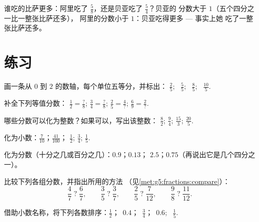 \begin{example}\label{ex:g5:fractions:compare}
谁吃的比萨更多：阿里吃了 $\frac58$，还是贝亚吃了 $\frac54$？贝亚的
分数大于 $1$（五个四分之一比一整张比萨还多），
阿里的分数小于 $1$：贝亚吃得更多 --- 事实上她
吃了一整张比萨还多。
\end{example}

\section{练习}

\begin{exercise}[$\star$]\label{exo:g5:fractions:1}
画一条从 $0$ 到 $2$ 的数轴，每个单位五等分，并标出：
$\frac25$; \ $\frac55$; \ $\frac85$; \ $\frac{10}{5}$.
\end{exercise}

\begin{exercise}[$\star$]\label{exo:g5:fractions:2}
补全下列等值分数：
$\frac12 = \frac{?}{8}$; \quad
$\frac34 = \frac{?}{8}$; \quad
$\frac{2}{5} = \frac{4}{?}$; \quad
$\frac{6}{9} = \frac{2}{?}$.
\end{exercise}

\begin{exercise}[$\star$]\label{exo:g5:fractions:3}
哪些分数可以化为整数？如果可以，写出该整数：
$\frac82$; \quad $\frac{9}{4}$; \quad $\frac{15}{3}$; \quad
$\frac{20}{5}$.
\end{exercise}

\begin{exercise}[$\star$]\label{exo:g5:fractions:4}
化为小数：$\frac{7}{10}$；\quad $\frac{41}{100}$；\quad
$\frac12$; \quad $\frac34$; \quad $\frac15$.
\end{exercise}

\begin{exercise}[$\star$]\label{exo:g5:fractions:5}
化为分数（十分之几或百分之几）：$0.9$；\quad $0.13$；
\quad $2.5$；\quad $0.75$（再说出它是几个四分之一）。
\end{exercise}

\begin{exercise}[$\star$]\label{exo:g5:fractions:6}
比较下列各组分数，并指出所用的方法
（见\cref{met:g5:fractions:compare}）：
\[
\frac47 \;?\; \frac67, \qquad
\frac35 \;?\; \frac37, \qquad
\frac25 \;?\; \frac{7}{12}, \qquad
\frac98 \;?\; \frac{11}{12} .
\]
\end{exercise}

\begin{exercise}[$\star$]\label{exo:g5:fractions:7}
借助小数名称，将下列各数排序：$\frac12$；\ $0.4$；\ $\frac34$；\
$0.6$; \ $\frac15$.
\end{exercise}

